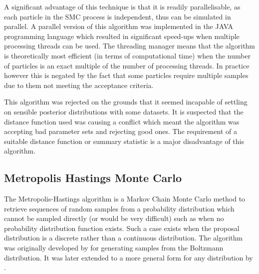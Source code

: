 A significant advantage of this technique is that it is readily parallelisable, as each particle in the SMC process is independent, thus can be simulated in parallel. A parallel version of this algorithm was implemented in the JAVA programming language which resulted in significant speed-ups when multiple processing threads can be used. The threading manager means that the algorithm is theoretically most efficient (in terms of computational time) when the number of particles is an exact multiple of the number of processing threads. In practice however this is negated by the fact that some particles require multiple samples due to them not meeting the acceptance criteria.


This algorithm was rejected on the grounds that it seemed incapable of settling on sensible posterior distributions with some datasets. It is suspected that the distance function used was causing a conflict which meant the algorithm was accepting bad parameter sets and rejecting good ones. The requirement of a suitable distance function or summary statistic is a major disadvantage of this algorithm.

\subsection{Metropolis Hastings Monte Carlo}
The Metropolis-Hastings algorithm is a Markov Chain Monte Carlo method to retrieve sequences of random samples from a probability distribution which cannot be sampled directly (or would be very difficult) such as when no probability distribution function exists. Such a case exists when the proposal distribution is a discrete rather than a continuous distribution. The algorithm was originally developed by \citet{Metropolis1953} for generating samples from the Boltzmann distribution. It was later extended to a more general form for any distribution by \citet{Hastings1970}.

